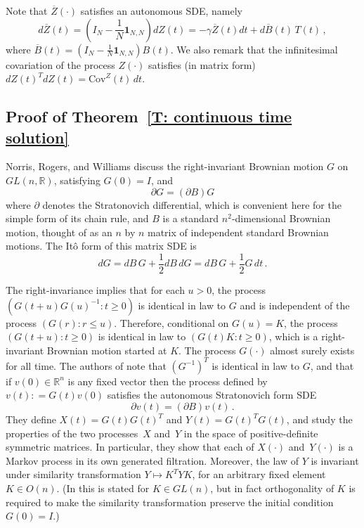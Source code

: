 \documentclass[12pt]{article}
\newcommand{\Cov}{\mathrm{Cov}}
\newcommand{\1}{\mathbf{1}}
\begin{document}
Note that $\overline{Z}(\cdot)$ satisfies an autonomous SDE, namely
$$d\overline{Z}(t)  = \left(I_N- \frac{1}{N}\mathbf{1}_{N,N}\right)d Z(t) = -\gamma\overline{Z}(t) dt + d\overline{B}(t)\,T(t)\,,  $$
where $\overline{B}(t) = \left(I_N- \frac{1}{N}\mathbf{1}_{N,N}\right)B(t)$.
We also remark that the infinitesimal covariation of the process $Z(\cdot)$ satisfies (in matrix form) $dZ(t)^T dZ(t) = \Cov^Z(t)\,dt$. 


\subsection{Proof of Theorem~\ref{T: continuous time solution}}

Norris, Rogers, and Williams \cite{NRW} discuss
 the right-invariant Brownian motion $G$ on $GL(n,\mathbb{R})$, satisfying $G(0) = I$, and $$ \partial G = (\partial B)G$$ where $\partial$ denotes the Stratonovich differential, which is convenient here for the simple form of its chain rule, and $B$ is a standard $n^2$-dimensional Brownian motion, thought of as an $n$ by $n$ matrix of independent standard Brownian motions. The It\^{o} form of this matrix SDE is
$$dG = dB\, G + \frac{1}{2}dB\,dG = dB\, G + \frac{1}{2}G \,dt\,. $$

The right-invariance implies that for each $u> 0$, the process $(G(t+u)G(u)^{-1}: t \ge 0)$ is identical in law to $G$ and is independent of the process $(G(r): r \le u)$. Therefore, conditional on $G(u) = K$, the process $(G(t+u): t \ge 0)$ is identical in law to $(G(t)K: t \ge 0)$, which is a right-invariant Brownian motion started at $K$. The process $G(\cdot)$ almost surely exists for all time. The authors of \cite{NRW} note that $\left(G^{-1}\right)^T$ is identical in law to $G$, and that if $v(0) \in \mathbb{R}^n$ is any fixed vector then the process defined by $v(t): = G(t)v(0)$ satisfies the autonomous Stratonovich form SDE $$ \partial v(t) = (\partial B) v(t)\,.$$ They define $X(t) = G(t)G(t)^T$ and $Y(t) = G(t)^T G(t)$, and study the properties of the two processes~$X$ and~$Y$ in the space of positive-definite symmetric matrices. In particular, they show that each of $X(\cdot)$ and~$Y(\cdot)$ is a Markov process in its own generated filtration. Moreover, the law of $Y$ is invariant under similarity transformation $Y \mapsto K^T YK$, for an arbitrary fixed element $K \in O(n)$. (In \cite{NRW} this is stated for $K \in GL(n)$, but in fact orthogonality of $K$ is required to make the similarity transformation preserve the initial condition $G(0) = I$.)  
\end{document}
